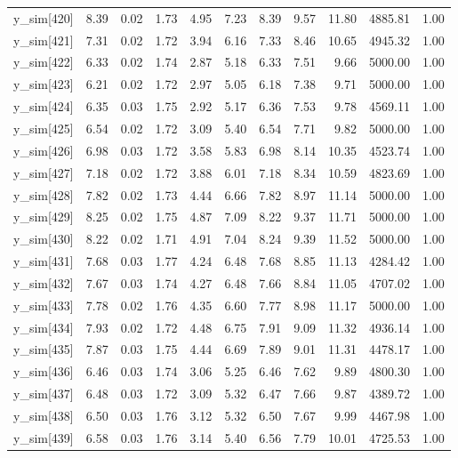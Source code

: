 \begin{table}[ht]
\begin{tabular}{rrrrrrrrrrr}
  y\_sim[420] & 8.39 & 0.02 & 1.73 & 4.95 & 7.23 & 8.39 & 9.57 & 11.80 & 4885.81 & 1.00 \\ 
  y\_sim[421] & 7.31 & 0.02 & 1.72 & 3.94 & 6.16 & 7.33 & 8.46 & 10.65 & 4945.32 & 1.00 \\ 
  y\_sim[422] & 6.33 & 0.02 & 1.74 & 2.87 & 5.18 & 6.33 & 7.51 & 9.66 & 5000.00 & 1.00 \\ 
  y\_sim[423] & 6.21 & 0.02 & 1.72 & 2.97 & 5.05 & 6.18 & 7.38 & 9.71 & 5000.00 & 1.00 \\ 
  y\_sim[424] & 6.35 & 0.03 & 1.75 & 2.92 & 5.17 & 6.36 & 7.53 & 9.78 & 4569.11 & 1.00 \\ 
  y\_sim[425] & 6.54 & 0.02 & 1.72 & 3.09 & 5.40 & 6.54 & 7.71 & 9.82 & 5000.00 & 1.00 \\ 
  y\_sim[426] & 6.98 & 0.03 & 1.72 & 3.58 & 5.83 & 6.98 & 8.14 & 10.35 & 4523.74 & 1.00 \\ 
  y\_sim[427] & 7.18 & 0.02 & 1.72 & 3.88 & 6.01 & 7.18 & 8.34 & 10.59 & 4823.69 & 1.00 \\ 
  y\_sim[428] & 7.82 & 0.02 & 1.73 & 4.44 & 6.66 & 7.82 & 8.97 & 11.14 & 5000.00 & 1.00 \\ 
  y\_sim[429] & 8.25 & 0.02 & 1.75 & 4.87 & 7.09 & 8.22 & 9.37 & 11.71 & 5000.00 & 1.00 \\ 
  y\_sim[430] & 8.22 & 0.02 & 1.71 & 4.91 & 7.04 & 8.24 & 9.39 & 11.52 & 5000.00 & 1.00 \\ 
  y\_sim[431] & 7.68 & 0.03 & 1.77 & 4.24 & 6.48 & 7.68 & 8.85 & 11.13 & 4284.42 & 1.00 \\ 
  y\_sim[432] & 7.67 & 0.03 & 1.74 & 4.27 & 6.48 & 7.66 & 8.84 & 11.05 & 4707.02 & 1.00 \\ 
  y\_sim[433] & 7.78 & 0.02 & 1.76 & 4.35 & 6.60 & 7.77 & 8.98 & 11.17 & 5000.00 & 1.00 \\ 
  y\_sim[434] & 7.93 & 0.02 & 1.72 & 4.48 & 6.75 & 7.91 & 9.09 & 11.32 & 4936.14 & 1.00 \\ 
  y\_sim[435] & 7.87 & 0.03 & 1.75 & 4.44 & 6.69 & 7.89 & 9.01 & 11.31 & 4478.17 & 1.00 \\ 
  y\_sim[436] & 6.46 & 0.03 & 1.74 & 3.06 & 5.25 & 6.46 & 7.62 & 9.89 & 4800.30 & 1.00 \\ 
  y\_sim[437] & 6.48 & 0.03 & 1.72 & 3.09 & 5.32 & 6.47 & 7.66 & 9.87 & 4389.72 & 1.00 \\ 
  y\_sim[438] & 6.50 & 0.03 & 1.76 & 3.12 & 5.32 & 6.50 & 7.67 & 9.99 & 4467.98 & 1.00 \\ 
  y\_sim[439] & 6.58 & 0.03 & 1.76 & 3.14 & 5.40 & 6.56 & 7.79 & 10.01 & 4725.53 & 1.00 \\ 

\end{tabular}
\end{table}
